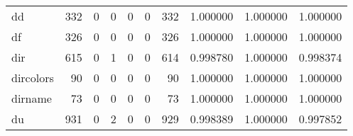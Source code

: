 \begin{longtable}{lrrrrrrrrr}
dd        &                                   332 &                                                  0 &                                                  0 &                                                  0 &                                                  0 &                                                332 &                                           1.000000 &                               1.000000 &                             1.000000 \\
df        &                                   326 &                                                  0 &                                                  0 &                                                  0 &                                                  0 &                                                326 &                                           1.000000 &                               1.000000 &                             1.000000 \\
dir       &                                   615 &                                                  0 &                                                  1 &                                                  0 &                                                  0 &                                                614 &                                           0.998780 &                               1.000000 &                             0.998374 \\
dircolors &                                    90 &                                                  0 &                                                  0 &                                                  0 &                                                  0 &                                                 90 &                                           1.000000 &                               1.000000 &                             1.000000 \\
dirname   &                                    73 &                                                  0 &                                                  0 &                                                  0 &                                                  0 &                                                 73 &                                           1.000000 &                               1.000000 &                             1.000000 \\
du        &                                   931 &                                                  0 &                                                  2 &                                                  0 &                                                  0 &                                                929 &                                           0.998389 &                               1.000000 &                             0.997852 \\

\end{longtable}
